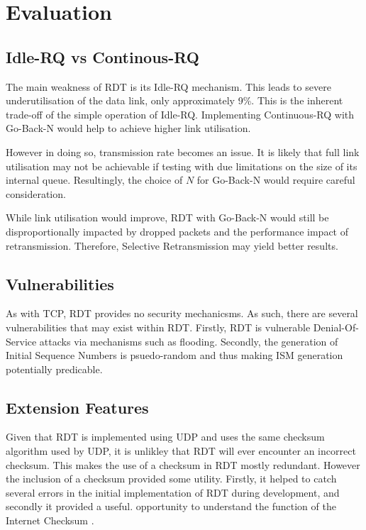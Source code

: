\section{Evaluation}
\subsection{Idle-RQ vs Continous-RQ}
The main weakness of RDT is its Idle-RQ mechanism. This leads to severe underutilisation of the data link, only approximately 9\%. This is the inherent trade-off of the simple operation of Idle-RQ. Implementing Continuous-RQ with Go-Back-N would help to achieve higher link utilisation. 

However in doing so, transmission rate becomes an issue. It is likely that full link utilisation may not be achievable if testing with  due limitations on the size of its internal queue. Resultingly, the choice of $N$ for Go-Back-N would require careful consideration. 

While link utilisation would improve, RDT with Go-Back-N would still be disproportionally impacted by dropped packets and the performance impact of retransmission. Therefore, Selective Retransmission may yield better results.

\subsection{Vulnerabilities}
As with TCP, RDT provides no security mechanicsms. As such, there are several vulnerabilities that may exist within RDT. 
Firstly, RDT is vulnerable Denial-Of-Service attacks via mechanisms such as  flooding.
Secondly, the generation of Initial Sequence Numbers is psuedo-random and thus making ISM generation potentially predicable. 

\subsection{Extension Features}

Given that RDT is implemented using UDP and uses the same checksum algorithm used by UDP, it is unlikley that RDT will ever encounter an incorrect checksum. This makes the use of a checksum in RDT mostly redundant. However the inclusion of a checksum provided some utility. Firstly, it helped to catch several errors in the initial implementation of RDT during development, and secondly it provided a useful. opportunity to understand the function of the Internet Checksum \cite{rfc1071}.

